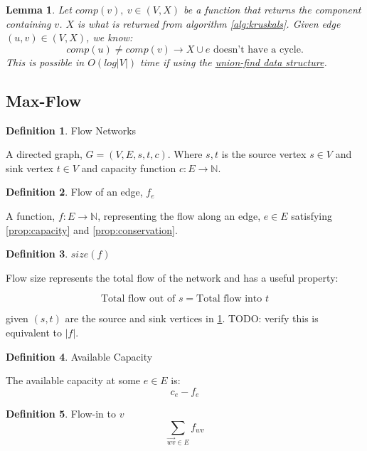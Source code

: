 \documentclass{article}
\newtheorem{lemma}[theorem]{Lemma}
\theoremstyle{definition}
\newtheorem{definition}{Definition}[section]
\begin{document}
\begin{lemma}
	Let $comp(v), \: v \in (V,X)$ be a function that returns the component containing $v$. $X$ is what is returned from algorithm \ref{alg:kruskals}. Given edge $(u,v) \in (V,X)$, we know:
	$$comp(u) \neq comp(v) \to X \cup e \text{ doesn't have a cycle.}$$
	This is possible in $O(log|V|)$ time if using the \href{https://en.wikipedia.org/wiki/Disjoint-set_data_structure}{union-find data structure}.
\end{lemma}

\subsection{Max-Flow}
\begin{definition}{Flow Networks}
\label{def:flow_networks}

A directed graph, $G = (V, E, s, t, c)$. Where $s, t$ is the source vertex $s \in V$ and sink vertex $t \in V$ and capacity function $c:E \to \mathbb{N}$.
\end{definition}


\begin{definition}{Flow of an edge, $f_e$}
\label{prop:flow_edge}
	
A function, $f:E \to \mathbb{N}$, representing the flow along an edge, $e \in E$ satisfying \ref{prop:capacity} and \ref{prop:conservation}.
\end{definition}

\begin{definition}{$size(f)$}
\label{prop:size}
	
Flow size represents the total flow of the network and has a useful property:
	
$$\text{Total flow out of } s = \text{Total flow into } t$$
	
given $(s, t)$ are the source and sink vertices in \ref{def:flow_networks}. TODO: verify this is equivalent to $|f|$.
\end{definition}

\begin{definition}{Available Capacity}
\label{def:available_cap}

The available capacity at some $e \in E$ is:
$$c_e - f_e$$
\end{definition}

\begin{definition}{Flow-in to $v$}
\label{def:flowin}
$$\sum_{\overrightarrow{wv} \in E}{f_{wv}}$$
\end{definition}
\end{document}
